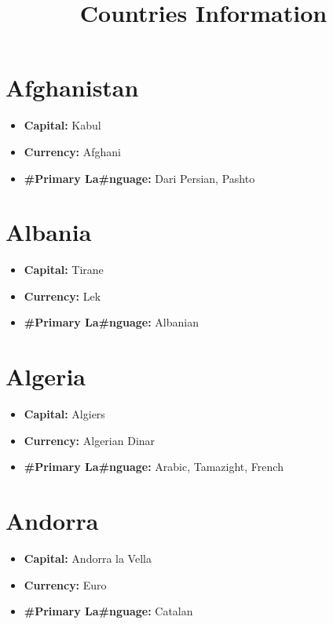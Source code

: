 \documentclass[a4paper,twoside]{book}
\title{\titlefont Countries Information}
\begin{document}
\maketitle
\section*{\Huge Afghanistan}
\vspace{5mm} %
\begin{itemize}
	\item \textbf{Capital:} Kabul
	\item \textbf{Currency:} Afghani
	\item \textbf{\#Primary La\#nguage:} Dari Persian, Pashto
\end{itemize}

\section*{\Huge Albania}
\vspace{5mm} %
\begin{itemize}
	\item \textbf{Capital:} Tirane
	\item \textbf{Currency:} Lek
	\item \textbf{\#Primary La\#nguage:} Albanian
\end{itemize}

\section*{\Huge Algeria}
\vspace{5mm} %
\begin{itemize}
	\item \textbf{Capital:} Algiers
	\item \textbf{Currency:} Algerian Dinar
	\item \textbf{\#Primary La\#nguage:} Arabic, Tamazight, French
\end{itemize}

\section*{\Huge Andorra}
\vspace{5mm} %
\begin{itemize}
	\item \textbf{Capital:} Andorra la Vella
	\item \textbf{Currency:} Euro
	\item \textbf{\#Primary La\#nguage:} Catalan
\end{itemize}
\end{document}
